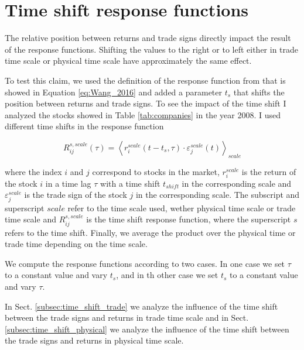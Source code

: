 \section{Time shift response functions}\label{sec:time_shift}

The relative position between returns and trade signs directly impact the
result of the response functions. Shifting the values to the right or to left
either in trade time scale or physical time scale have approximately the same
effect.

To test this claim, we used the definition of the response function from
\cite{Wang_2016_cross} that is showed in Equation \ref{eq:Wang_2016} and added
a parameter $t_{s}$ that shifts the position between returns and trade signs.
To see the impact of the time shift I analyzed the stocks showed in Table
\ref{tab:companies} in the year 2008. I used different time shifts in the
response function

\begin{equation}\label{eq:time_shift_general}
    R_{ij}^{s, scale}\left(\tau\right)=\left\langle r^{scale}_{i}
    \left(t-t_{s},\tau\right) \cdot\varepsilon^{scale}_{j}
    \left(t\right)\right\rangle _{scale}
\end{equation}

where the index $i$ and $j$ correspond to stocks in the market, $r^{scale}_{i}$
is the return of the stock $i$ in a time lag $\tau$ with a time shift
$t_{shift}$ in the corresponding scale and $\varepsilon^{scale}_{j}$ is the
trade sign of the stock $j$ in the corresponding scale. The subscript and
superscript $scale$ refer to the time scale used, wether physical time scale or
trade time scale and $R_{ij}^{s,scale}$ is the time shift response function,
where the superscript $s$ refers to the time shift. Finally, we average the
product over the physical time or trade time depending on the time scale.

We compute the response functions according to two cases. In one case we set
$\tau$ to a constant value and vary $t_{s}$, and in th other case we set
$t_{s}$ to a constant value and vary $\tau$.

In Sect. \ref{subsec:time_shift_trade} we analyze the influence of the time
shift between the trade signs and returns in trade time scale and in Sect.
\ref{subsec:time_shift_physical} we analyze the influence of the time shift
between the trade signs and returns in physical time scale.

